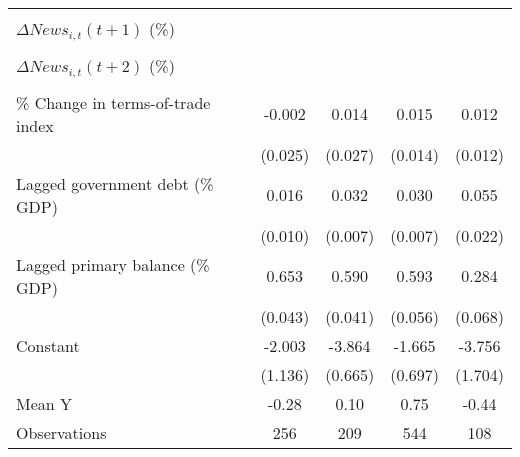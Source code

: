 {\begin{tabular}{l*{4}{c}}
                    &                     &                     &                     &                     \\
\addlinespace
$ \Delta News_{i,t}(t+1)$ (\%)&                     &                     &                     &                     \\
                    &                     &                     &                     &                     \\
\addlinespace
$ \Delta News_{i,t}(t+2)$ (\%)&                     &                     &                     &                     \\
                    &                     &                     &                     &                     \\
\addlinespace
\% Change in terms-of-trade index&      -0.002         &       0.014         &       0.015         &       0.012         \\
                    &     (0.025)         &     (0.027)         &     (0.014)         &     (0.012)         \\
\addlinespace
Lagged government debt (\% GDP)&       0.016         &       0.032\sym{***}&       0.030\sym{***}&       0.055\sym{**} \\
                    &     (0.010)         &     (0.007)         &     (0.007)         &     (0.022)         \\
\addlinespace
Lagged primary balance (\% GDP)&       0.653\sym{***}&       0.590\sym{***}&       0.593\sym{***}&       0.284\sym{***}\\
                    &     (0.043)         &     (0.041)         &     (0.056)         &     (0.068)         \\
\addlinespace
Constant            &      -2.003         &      -3.864\sym{***}&      -1.665\sym{**} &      -3.756\sym{**} \\
                    &     (1.136)         &     (0.665)         &     (0.697)         &     (1.704)         \\
\midrule
Mean Y              &       -0.28         &        0.10         &        0.75         &       -0.44         \\
Observations        &         256         &         209         &         544         &         108         \\
\bottomrule
\end{tabular}
}
